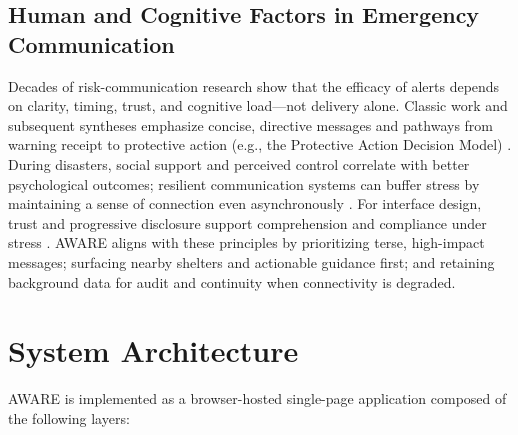\subsection{Human and Cognitive Factors in Emergency Communication}
Decades of risk-communication research show that the efficacy of alerts depends on clarity, timing, trust, and cognitive load---not delivery alone. Classic work and subsequent syntheses emphasize concise, directive messages and pathways from warning receipt to protective action (e.g., the Protective Action Decision Model) \cite{mileti-1990-ornl6609,lindell-2012-padm,nasem-2018-alerts}. During disasters, social support and perceived control correlate with better psychological outcomes; resilient communication systems can buffer stress by maintaining a sense of connection even asynchronously \cite{cohen-1985-socialsupport,norris-2008-resilience}. For interface design, trust and progressive disclosure support comprehension and compliance under stress \cite{paton-2008-warningresponse}. AWARE aligns with these principles by prioritizing terse, high-impact messages; surfacing nearby shelters and actionable guidance first; and retaining background data for audit and continuity when connectivity is degraded.

\section{System Architecture}
AWARE is implemented as a browser-hosted single-page application composed of the following layers:


